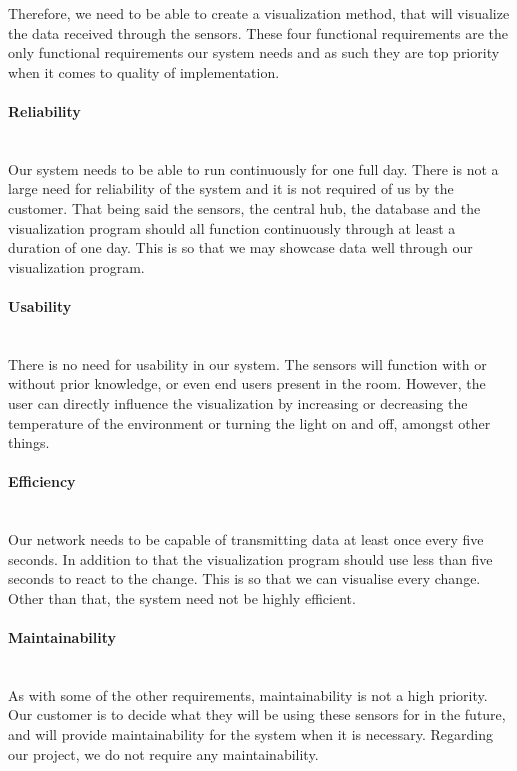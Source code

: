 \documentclass[../document.tex]{subfiles}
\begin{document}
Therefore, we need to be able to create a visualization method, that will visualize the data received through the sensors. These four functional requirements are the only functional requirements our system needs and as such they are top priority when it comes to quality of implementation.

\paragraph{Reliability} \ \\
Our system needs to be able to run continuously for one full day. There is not a large need for reliability of the system and it is not required of us by the customer. That being said the sensors, the central hub, the database and the visualization program should all function continuously through at least a duration of one day. This is so that we may showcase data well through our visualization program.

\paragraph{Usability} \ \\
There is no need for usability in our system. The sensors will function with or without prior knowledge, or even end users present in the room. However, the user can directly influence the visualization by increasing or decreasing the temperature of the environment or turning the light on and off, amongst other things.

\paragraph{Efficiency} \ \\
Our network needs to be capable of transmitting data at least once every five seconds. In addition to that the visualization program should use less than five seconds to react to the change. This is so that we can visualise every change. Other than that, the system need not be highly efficient.

\paragraph{Maintainability} \ \\
As with some of the other requirements, maintainability is not a high priority. Our customer is to decide what they will be using these sensors for in the future, and will provide maintainability for the system when it is necessary. Regarding our project, we do not require any maintainability.
\end{document}
